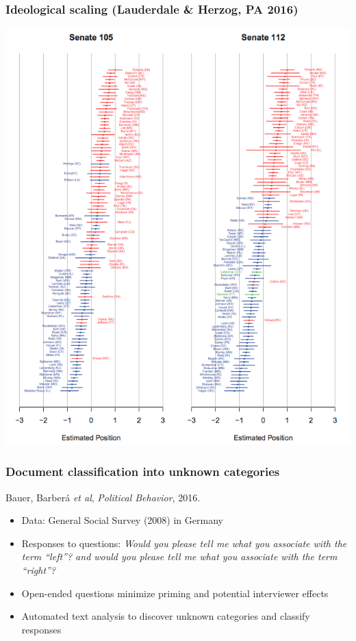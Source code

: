 \documentclass[notes=hide]{beamer}
\begin{document}
\begin{frame}
	\frametitle{Ideological scaling (Lauderdale \& Herzog, PA 2016)}
	\centering 
	\includegraphics[height=.9\textheight]{figures/lauderdale-herzog-PA.png}
	
\end{frame}

\begin{frame}
	\frametitle{Document classification into unknown categories}
	Bauer, Barber\'{a} \textit{et al}, \textit{Political Behavior}, 2016.
	\begin{itemize}[<+->]
		\item Data: General Social Survey (2008) in Germany
		\item Responses to questions: \textit{Would you please tell me what you associate with the term ``left''? and would you please tell me what you associate with the term ``right''?}
		\item Open-ended questions minimize priming and potential interviewer effects
		\item Automated text analysis to discover unknown categories and classify responses
	\end{itemize}
\end{frame}
\end{document}
